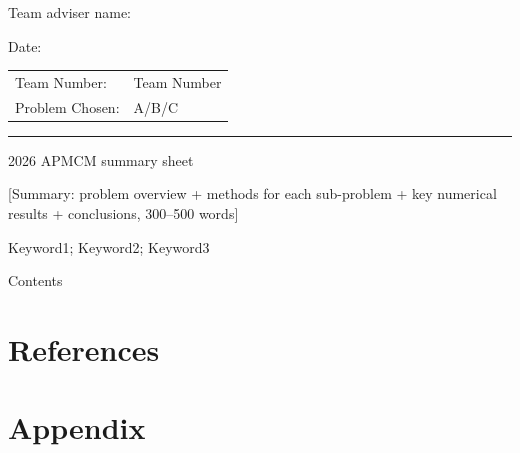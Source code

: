\documentclass[fontset=mac, 12pt, a4paper]{ctexart}
\begin{document}
\noindent Team adviser name: \underline{}

\vspace{1.05em}
\hfill Date: \underline{\makebox[4cm]{}}

\newpage

\vspace{0.4em}
\begin{center}
\begin{tabular}{ll}
  Team Number: & Team Number \\
  Problem Chosen: & A/B/C \\
\end{tabular}
\end{center}
\vspace{1.35em}
\noindent\rule{\textwidth}{2pt}
\vspace{1.35em}

\begin{center}
  {\fontsize{12pt}{14.4pt} 2026 APMCM summary sheet}
\end{center}
\vspace{1.2em}

[Summary: problem overview + methods for each sub-problem + key numerical results + conclusions, 300--500 words]

\vspace{0.45em}

 Keyword1; Keyword2; Keyword3

\newpage

\begin{center}
  {\fontsize{17pt}{20.4pt} Contents}
\end{center}
\vspace{1em}
\tableofcontents
\newpage









\section*{References}


\section*{Appendix}

\end{document}
